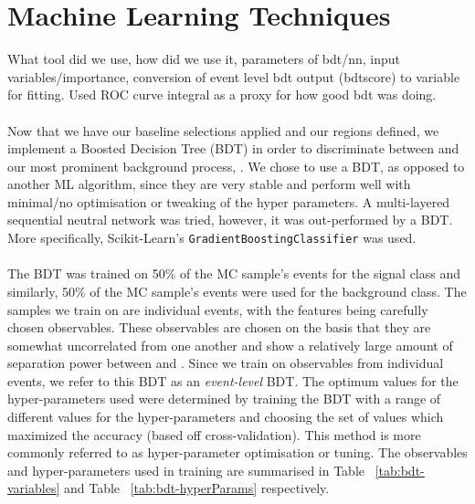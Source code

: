\section{Machine Learning Techniques}
What tool did we use, how did we use it, parameters of bdt/nn, input variables/importance, conversion of event level bdt output (bdtscore) to variable for fitting. Used ROC curve integral as a proxy for how good bdt was doing.\\\\

Now that we have our baseline selections applied and our regions defined, we implement a Boosted Decision Tree (BDT) in order to discriminate between \tWZ and our most prominent background process, \ttZ. We chose to use a BDT, as opposed to another ML algorithm, since they are very stable and perform well with minimal/no optimisation or tweaking of the hyper parameters. A multi-layered sequential neutral network was tried, however, it was out-performed by a BDT. More specifically, Scikit-Learn's \texttt{GradientBoostingClassifier} was used.\\\\
The BDT was trained on 50$\%$ of the \tWZ MC sample's events for the signal class and similarly, 50$\%$ of the \ttZ MC sample's events were used for the background class. The samples we train on are individual events, with the features being carefully chosen observables. These observables are chosen on the basis that they are somewhat uncorrelated from one another and show a relatively large amount of separation power between \tWZ and \ttZ. Since we train on observables from individual events, we refer to this BDT as an \textit{event-level} BDT. The optimum values for the hyper-parameters used were determined by training the BDT with a range of different values for the hyper-parameters and choosing the set of values which maximized the accuracy (based off cross-validation). This method is more commonly referred to as hyper-parameter optimisation or tuning. The observables and hyper-parameters used in training are summarised in Table ~\ref{tab:bdt-variables} and Table ~\ref{tab:bdt-hyperParams} respectively.
\pagebreak



